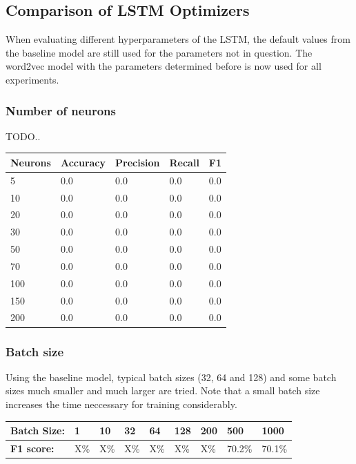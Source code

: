 \documentclass[
	a4paper,
	pagesize,
	pdftex,
	12pt,
	twoside, %
	BCOR=5mm, %
	ngerman,
	fleqn,
	final,
	]{scrartcl}
\begin{document}
\subsection{Comparison of LSTM Optimizers}

When evaluating different hyperparameters of the LSTM, the default values from the baseline model are still used for the parameters not in question. The word2vec model with the parameters determined before is now used for all experiments.

\subsubsection{Number of neurons}

TODO..


\begin{tabular}{ | p{2cm} || p{2cm}|p{2cm}|p{2cm}|p{2cm}|  }
	\hline
	Neurons & Accuracy & Precision & Recall & F1 \\
	\hline
	5 & 0.0 &  0.0 &  0.0 &  0.0 \\
	10 & 0.0 &  0.0 &  0.0 &  0.0 \\
	20 & 0.0 &  0.0 &  0.0 &  0.0 \\
	30 & 0.0 &  0.0 &  0.0 &  0.0 \\
	50 & 0.0 &  0.0 &  0.0 &  0.0 \\
	70 & 0.0 &  0.0 &  0.0 &  0.0 \\
	100 & 0.0 &  0.0 &  0.0 &  0.0 \\
	150 & 0.0 &  0.0 &  0.0 &  0.0 \\
	200 & 0.0 &  0.0 &  0.0 &  0.0 \\
	\hline
	\hline
\end{tabular}



\subsubsection{Batch size}

Using the baseline model, typical batch sizes (32, 64 and 128) and some batch sizes much smaller and much larger are tried. Note that a small batch size increases the time neccessary for training considerably.

\begin{tabular} { | p{3cm} || p{0.8cm} | p{0.8cm} |  p{0.8cm} | p{0.8cm}  | p{0.8cm} | p{0.8cm} | p{0.8cm}| p{0.8cm} |}
	\hline
	\textbf{Batch Size:}  & 1 & 10 & 32 & 64 & 128 & 200 & 500 & 1000\\   
	\hline
	\textbf{F1 score:} & X\% & X\% & X\% & X\% & X\% & X\% & 70.2\% & 70.1\% \\
	\hline
	\hline
\end{tabular}
\end{document}
